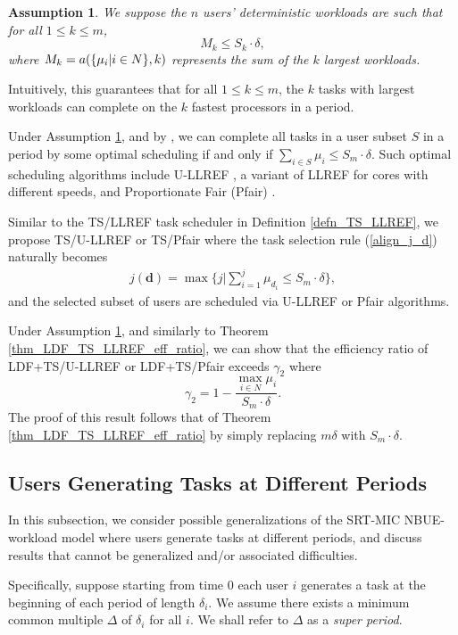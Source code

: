 \documentclass[prodmode,acmtompecs]{acmsmall}
\newtheorem{assumption}{\textbf{Assumption}}
\newcommand{\fullUserSet}{N}
\begin{document}
\begin{assumption}
\label{assumption_largest_workload_compatible}
We suppose the $n$ users' deterministic workloads are such that for all $1 \leq k \leq m$, 
$$
M_k \leq S_k \cdot \delta, 
$$
where $M_k = \sumFnName(\{\mu_i | i\in \fullUserSet \}, k)$ represents the sum of the $k$ largest workloads. 
\end{assumption}

Intuitively, this guarantees that for all $1\leq k \leq m$, the $k$ tasks with largest workloads can complete on the $k$ fastest processors in a period. 

Under Assumption \ref{assumption_largest_workload_compatible}, and by \cite{FGB01,FuM09}, we can complete all tasks in a user subset $S$ in a period by some optimal scheduling if and only if $\sum\limits_{i\in S} \mu_i \leq S_m \cdot \delta$. Such optimal scheduling algorithms include U-LLREF \cite{FuM09}, a variant of LLREF for cores with different speeds, and Proportionate Fair (Pfair) \cite{BCP96}. 

Similar to the TS/LLREF task scheduler in Definition \ref{defn_TS_LLREF}, we propose TS/U-LLREF or TS/Pfair where the task selection rule (\ref{align_j_d}) naturally becomes 
\begin{align}
\label{align_j_d_different_speed}
j(\mathbf{d}) = \max\Big\{j | \sum\limits_{i = 1}^{j} \mu_{d_i} \leq S_m \cdot \delta \Big\}, 
\end{align}
and the selected subset of users are scheduled via U-LLREF or Pfair algorithms. 

Under Assumption \ref{assumption_largest_workload_compatible}, and similarly to Theorem \ref{thm_LDF_TS_LLREF_eff_ratio}, we can show that the efficiency ratio of LDF+TS/U-LLREF or LDF+TS/Pfair exceeds $\gamma_2$ where
$$
\gamma_2 = 1 - \frac{\max\limits_{i \in \fullUserSet} \mu_i}{S_m \cdot \delta}. 
$$
The proof of this result follows that of Theorem \ref{thm_LDF_TS_LLREF_eff_ratio} by simply replacing $m\delta$ with $S_m \cdot \delta$. 


\subsection{Users Generating Tasks at Different Periods}
In this subsection, we consider possible generalizations of the SRT-MIC NBUE-workload model where users generate tasks at different periods, and discuss results that cannot be generalized and/or associated difficulties. 

Specifically, suppose starting from time $0$ each user $i$ generates a task at the beginning of each period of length $\delta_i$. We assume there exists a minimum common multiple $\Delta$ of $\delta_i$ for all $i$. We shall refer to $\Delta$ as a {\em super period}. 
\end{document}
